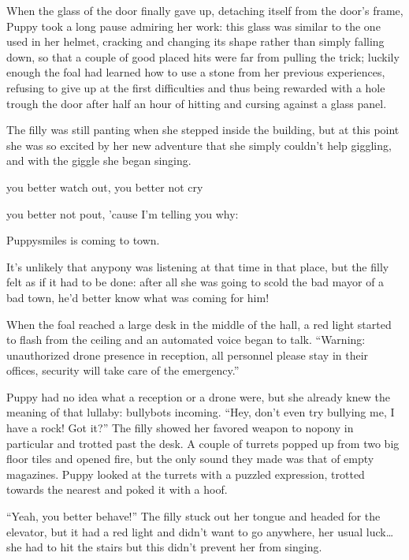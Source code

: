 When the glass of the door finally gave up, detaching itself from the door's frame, Puppy took a long pause admiring her work: this glass was similar to the one used in her helmet, cracking and changing its shape rather than simply falling down, so that a couple of good placed hits were far from pulling the trick; luckily enough the foal had learned how to use a stone from her previous experiences, refusing to give up at the first difficulties and thus being rewarded with a hole trough the door after half an hour of hitting and cursing against a glass panel.

The filly was still panting when she stepped inside the building, but at this point she was so excited by her new adventure that she simply couldn't help giggling, and with the giggle she began singing.

\begin{song}
you better watch out, you better not cry

you better not pout, 'cause I'm telling you why:

Puppysmiles is coming to town.
\end{song}

It's unlikely that anypony was listening at that time in that place, but the filly felt as if it had to be done: after all she was going to scold the bad mayor of a bad town, he'd better know what was coming for him!

When the foal reached a large desk in the middle of the hall, a red light started to flash from the ceiling and an automated voice began to talk. ``{\mt Warning: unauthorized drone presence in reception, all personnel please stay in their offices, security will take care of the emergency.}''

Puppy had no idea what a reception or a drone were, but she already knew the meaning of that lullaby: bullybots incoming. ``Hey, don't even try bullying me, I have a rock! Got it?'' The filly showed her favored weapon to nopony in particular and trotted past the desk. A couple of turrets popped up from two big floor tiles and opened fire, but the only sound they made was that of empty magazines. Puppy looked at the turrets with a puzzled expression, trotted towards the nearest and poked it with a hoof.

``Yeah, you better behave!'' The filly stuck out her tongue and headed for the elevator, but it had a red light and didn't want to go anywhere, her usual luck\dots she had to hit the stairs but this didn't prevent her from singing.


